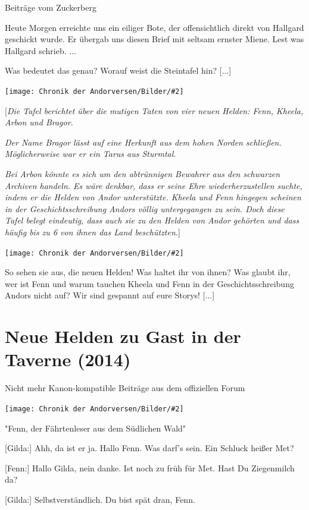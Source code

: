 \documentclass[10pt, a4paper, oneside]{book}
\newcommand{\storytext}[1]{%
    \section{#1}%
    \label{Storytext: #1}%
}
\newcommand{\bildmitts}[2][height=0.32\textwidth,width=0.48\textwidth,keepaspectratio]{%
    \begin{center}
        \texttt{[image: Chronik der Andorversen/Bilder/\#2]}
    \end{center}
}
\begin{document}
\begin{multicols}{2}
\begin{center}
    Beiträge vom Zuckerberg
\end{center}

Heute Morgen erreichte uns ein eiliger Bote, der offensichtlich direkt von Hallgard geschickt wurde. Er übergab uns diesen Brief mit seltsam ernster Miene. Lest was Hallgard schrieb. ...

Was bedeutet das genau? Worauf weist die Steintafel hin? [...]

\bildmitts{Seltsame Tafel Bild 3.jpg}

[\textit{Die Tafel berichtet über die mutigen Taten von vier neuen Helden: Fenn, Kheela, Arbon und Bragor.}

\textit{Der Name Bragor lässt auf eine Herkunft aus dem hohen Norden schließen. Möglicherweise war er ein Tarus aus Sturmtal.}

\textit{Bei Arbon könnte es sich um den abtrünnigen Bewahrer aus den schwarzen Archiven handeln. Es wäre denkbar, dass er seine Ehre wiederherzustellen suchte, indem er die Helden von Andor unterstützte. Kheela und Fenn hingegen scheinen in der Geschichtsschreibung Andors völlig untergegangen zu sein. Doch diese Tafel belegt eindeutig, dass auch sie zu den Helden von Andor gehörten und dass häufig bis zu 6 von ihnen das Land beschützten.}]

\bildmitts{Seltsame Tafel Bild 4.jpg}

So sehen sie aus, die neuen Helden! Was haltet ihr von ihnen? Was glaubt ihr, wer ist Fenn und warum tauchen Kheela und Fenn in der Geschichtsschreibung Andors nicht auf? Wir sind gespannt auf eure Storys! [...]




\storytext{Neue Helden zu Gast in der Taverne (2014)}

\begin{center}
    Nicht mehr Kanon-kompatible Beiträge aus dem offiziellen Forum
\end{center}

\bildmitts{NH Taverne Fenn.jpg}

\begin{center}
    "Fenn, der Fährtenleser aus dem Südlichen Wald"
\end{center}


[Gilda:] Ahh, da ist er ja. Hallo Fenn. Was darf’s sein. Ein Schluck heißer Met?

[Fenn:] Hallo Gilda, nein danke. Ist noch zu früh für Met. Hast Du Ziegenmilch da?


[Gilda:] Selbstverständlich. Du bist spät dran, Fenn.


\end{multicols}
\end{document}
